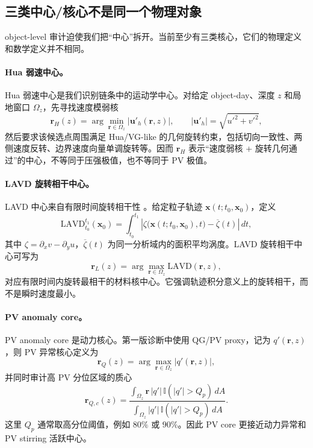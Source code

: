\documentclass[11pt,a4paper]{ctexart}
\begin{document}
\subsection{三类中心/核心不是同一个物理对象}

object-level 审计迫使我们把“中心”拆开。当前至少有三类核心，它们的物理定义和数学定义并不相同。

\paragraph{Hua 弱速中心。}
Hua 弱速中心是我们识别链条中的运动学中心。对给定 object-day、深度 $z$ 和局地窗口 $\Omega_z$，先寻找速度模弱核
\begin{equation}
  \mathbf r_H(z)
  =\arg\min_{\mathbf r\in\Omega_z}
  |\mathbf u'_h(\mathbf r,z)|,
  \qquad
  |\mathbf u'_h|=\sqrt{u'^2+v'^2},
\end{equation}
然后要求该候选点周围满足 Hua/VG-like 的几何旋转约束，包括切向一致性、两侧速度反转、边界速度向量单调旋转等。因而 $\mathbf r_H$ 表示“速度弱核 + 旋转几何通过”的中心，不等同于压强极值，也不等同于 PV 极值。

\paragraph{LAVD 旋转相干中心。}
LAVD 中心来自有限时间旋转相干性 \cite{HallerEtAl2016}。给定粒子轨迹 $\mathbf x(t;t_0,\mathbf x_0)$，定义
\begin{equation}
  \mathrm{LAVD}_{t_0}^{t_1}(\mathbf x_0)
  =\int_{t_0}^{t_1}
  \left|\zeta\bigl(\mathbf x(t;t_0,\mathbf x_0),t\bigr)-\overline{\zeta}(t)\right|\,dt,
\end{equation}
其中 $\zeta=\partial_x v-\partial_y u$，$\overline{\zeta}(t)$ 为同一分析域内的面积平均涡度。LAVD 旋转相干中心可写为
\begin{equation}
  \mathbf r_L(z)=\arg\max_{\mathbf r\in\Omega_z}\mathrm{LAVD}(\mathbf r,z),
\end{equation}
对应有限时间内旋转最相干的材料核中心。它强调轨迹积分意义上的旋转相干，而不是瞬时速度最小。

\paragraph{PV anomaly core。}
PV anomaly core 是动力核心。第一版诊断中使用 QG/PV proxy，记为 $q'(\mathbf r,z)$，则 PV 异常核心定义为
\begin{equation}
  \mathbf r_Q(z)
  =\arg\max_{\mathbf r\in\Omega_z}|q'(\mathbf r,z)|,
\end{equation}
并同时审计高 PV 分位区域的质心
\begin{equation}
  \mathbf r_{Q,c}(z)=
  \frac{\int_{\Omega_z}\mathbf r\,|q'|\,\mathbb I(|q'|>Q_p)\,dA}
       {\int_{\Omega_z}|q'|\,\mathbb I(|q'|>Q_p)\,dA}.
\end{equation}
这里 $Q_p$ 通常取高分位阈值，例如 $80\%$ 或 $90\%$。因此 PV core 更接近动力异常和 PV stirring 活跃中心。
\end{document}
